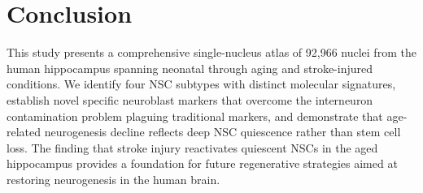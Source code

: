\documentclass[11pt]{article}
\begin{document}
\section{Conclusion}

This study presents a comprehensive single-nucleus atlas of 92,966 nuclei from the human hippocampus spanning neonatal through aging and stroke-injured conditions. We identify four NSC subtypes with distinct molecular signatures, establish novel specific neuroblast markers that overcome the interneuron contamination problem plaguing traditional markers, and demonstrate that age-related neurogenesis decline reflects deep NSC quiescence rather than stem cell loss. The finding that stroke injury reactivates quiescent NSCs in the aged hippocampus provides a foundation for future regenerative strategies aimed at restoring neurogenesis in the human brain.



\end{document}
